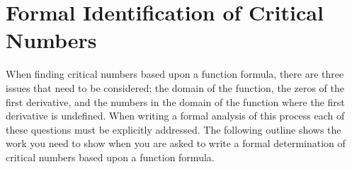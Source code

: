 \documentclass[10pt,oneside,]{book}
\theoremstyle{plain}
\theoremstyle{definition}
\numberwithin{equation}{section}
\begin{document}
\par\smallskip\noindent
\typeout{************************************************}
\typeout{************************************************}
\section[Formal ID of Critical Numbers]{Formal Identification of Critical Numbers}\label{section-formal-identification-of-critical-numbers}
When finding critical numbers based upon a function formula, there are three issues that need to be considered; the domain of the function, the zeros of the first derivative, and the numbers in the domain of the function where the first derivative is undefined.  When writing a formal analysis of this process each of these questions must be explicitly addressed.  The following outline shows the work you need to show when you are asked to write a formal determination of critical numbers based upon a function formula.%
\end{document}
